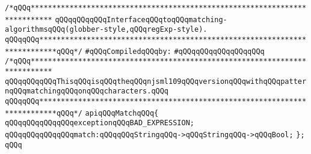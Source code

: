 \label{src/lib/tk/src/toolkit/regExp/match.api}
\verb|/*qQQq***************************************************************************|\newline
\verb|qQQqqQQqqQQqInterfaceqQQqtoqQQqmatching-algorithmsqQQq(globber-style,qQQqregExp-style).|\newline
\verb|qQQqqQQq**************************************************************************qQQq*/|\newline
\newline
\verb|#qQQqCompiledqQQqby:|\newline
\verb|#qQQqqQQqqQQqqQQqqQQq|\newline
\newline
\verb|/*qQQq***************************************************************************|\newline
\verb|qQQqqQQqqQQqThisqQQqisqQQqtheqQQqnjsml109qQQqversionqQQqwithqQQqpatternqQQqmatchingqQQqonqQQqcharacters.qQQq|\newline
\verb|qQQqqQQq**************************************************************************qQQq*/|\newline
\newline
\verb|apiqQQqMatchqQQq{|\newline
\newline
\verb|qQQqqQQqqQQqqQQqexceptionqQQqBAD_EXPRESSION;|\newline
\verb|qQQqqQQqqQQqqQQqmatch:qQQqqQQqStringqQQq->qQQqStringqQQq->qQQqBool;|\newline
\verb|};|\newline
\verb|qQQq|\newline
\newline

